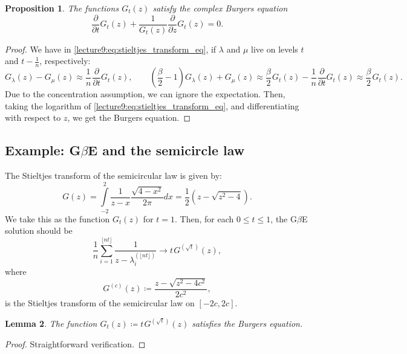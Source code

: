 \documentclass[letterpaper,11pt,oneside,reqno]{book}
\numberwithin{equation}{chapter}  %
\newcommand{\ssp}{\hspace{1pt}}
\newtheorem{proposition}{Proposition}[chapter]  %
\newtheorem{lemma}[proposition]{Lemma}
\theoremstyle{definition}
\begin{document}
\begin{proposition}
	The functions $G_t(z)$ satisfy the complex Burgers equation
	\begin{equation*}
		\frac{\partial}{\partial t}G_t(z) +
		\frac{1}{G_t(z)}\frac{\partial}{\partial z}G_t(z) = 0.
	\end{equation*}
\end{proposition}
\begin{proof}
	We have in \eqref{lecture9:eq:stieltjes_transform_eq},
	if $\lambda$ and $\mu$ live on levels $t$ and $t-\frac{1}{n}$,
	respectively:
	\begin{equation*}
		G_\lambda(z)-G_\mu(z)\approx
		\frac{1}{n}\ssp\frac{\partial}{\partial t}G_t(z),
		\qquad
		\left( \frac{\beta}{2}-1 \right)G_\lambda(z) + G_\mu(z) \approx
		\frac{\beta}{2}\ssp G_t(z) - \frac{1}{n}\ssp\frac{\partial}{\partial t}G_t(z)
		\approx
		\frac{\beta}{2}\ssp G_t(z) .
	\end{equation*}
	Due to the concentration assumption, we can ignore the expectation.
	Then, taking the logarithm of \eqref{lecture9:eq:stieltjes_transform_eq},
	and differentiating with respect to $z$,
	we get the Burgers equation.
\end{proof}

\subsection{Example: G\texorpdfstring{\(\beta\)}{beta}E and the semicircle law}

The Stieltjes transform of the semicircular law is given by:
\begin{equation*}
	G(z) = \int\limits_{-2}^{2}\frac{1}{z-x}\frac{\sqrt{4-x^2}}{2\pi}dx =
	\frac{1}{2} \left(z-\sqrt{z^2-4}\right).
\end{equation*}
We take this as the function $G_t(z)$ for $t=1$.
Then, for each $0\le t\le 1$, the
G$\beta$E solution should be
\begin{equation*}
	\frac{1}{n}\sum_{i=1}^{\lfloor nt \rfloor }\frac{1}{z-\lambda_i^{(\lfloor nt \rfloor )}}
	\to t\ssp G^{(\sqrt t)}(z),
\end{equation*}
where
\begin{equation*}
	G^{(c)}(z) \coloneqq \frac{z-\sqrt{z^2-4c^2}}{2c^2},
\end{equation*}
is the Stieltjes transform of the semicircular law on $[-2c, 2c]$.

\begin{lemma}
	\label{lecture9:lemma:semicircle_and_burgers}
	The function $G_t(z)\coloneqq t\ssp G^{(\sqrt t)}(z)$
	satisfies the Burgers equation.
\end{lemma}
\begin{proof}
	Straightforward verification.
\end{proof}
\end{document}
